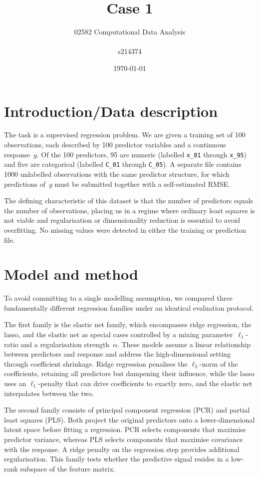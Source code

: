 \documentclass{article}
\title{Case 1}
\author{02582 Computational Data Analysis \\ \\ s214374}
\date{\today}
\begin{document}
\maketitle

\section*{Introduction/Data description}

The task is a supervised regression problem. We are given a training set of 100 observations, each described by 100 predictor variables and a continuous response~$y$. Of the 100 predictors, 95 are numeric (labelled \texttt{x\_01} through \texttt{x\_95}) and five are categorical (labelled \texttt{C\_01} through \texttt{C\_05}). A separate file contains 1000 unlabelled observations with the same predictor structure, for which predictions of~$y$ must be submitted together with a self-estimated RMSE.

The defining characteristic of this dataset is that the number of predictors equals the number of observations, placing us in a regime where ordinary least squares is not viable and regularisation or dimensionality reduction is essential to avoid overfitting. No missing values were detected in either the training or prediction file.

\section*{Model and method}

To avoid committing to a single modelling assumption, we compared three fundamentally different regression families under an identical evaluation protocol.

The first family is the elastic net family, which encompasses ridge regression, the lasso, and the elastic net as special cases controlled by a mixing parameter~$\ell_1$-ratio and a regularisation strength~$\alpha$. These models assume a linear relationship between predictors and response and address the high-dimensional setting through coefficient shrinkage. Ridge regression penalises the $\ell_2$-norm of the coefficients, retaining all predictors but dampening their influence, while the lasso uses an $\ell_1$-penalty that can drive coefficients to exactly zero, and the elastic net interpolates between the two.

The second family consists of principal component regression (PCR) and partial least squares (PLS). Both project the original predictors onto a lower-dimensional latent space before fitting a regression. PCR selects components that maximise predictor variance, whereas PLS selects components that maximise covariance with the response. A ridge penalty on the regression step provides additional regularisation. This family tests whether the predictive signal resides in a low-rank subspace of the feature matrix.
\end{document}
